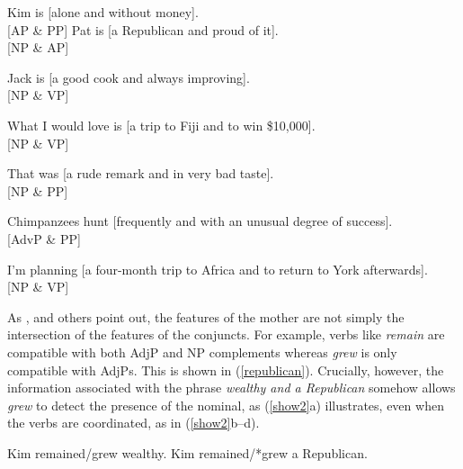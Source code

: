 \documentclass[output=paper
                ,modfonts
                ,nonflat
	        ,collection
	        ,collectionchapter
	        ,collectiontoclongg
 	        ,biblatex
                ,babelshorthands
                ,newtxmath
                ,draftmode
                ,colorlinks, citecolor=brown
]{./langsci/langscibook}
\begin{document}
{
\begin{exe}
\ex \begin{xlista}
\ex Kim is  [alone and without money].\\
 \hfill [AP \& PP]
\ex  Pat is [a Republican and proud of it]. \\
 \hfill [NP \& AP]

\ex  Jack is [a good cook and always improving].\\ \hfill [NP \& VP]

\ex What I would love is [a trip to Fiji and to win \$10,000].\\
\hfill [NP \& VP]

\ex  That was [a rude remark and in very bad taste]. \\
\hfill [NP \& PP]

\ex Chimpanzees hunt [frequently and with an unusual degree of success].\\
\hfill [AdvP \& PP]

\ex I'm  planning [a four-month trip to Africa and  to return to York afterwards].\\
\hfill [NP \& VP]
 \end{xlista}\label{unlk1}
\end{exe}


\noindent
As  \citet[417]{jacobson}, \citet{Sag:03} and others point out, the features of the mother are not simply the intersection of the features of the conjuncts. 
For example, verbs like \emph{remain} are compatible with both
AdjP and NP complements whereas \emph{grew}
is only compatible with AdjPs.
This is shown in  (\ref{republican}).
Crucially, however, the information associated with
the phrase \emph{wealthy and a Republican}
somehow allows \emph{grew} to detect the presence of
the nominal, as (\ref{show2}a) illustrates, even
when the verbs
are coordinated, as in (\ref{show2}b--d).


\begin{exe}
\ex
\begin{xlista}
\ex  Kim remained/grew wealthy.
\ex  Kim remained/*grew a Republican.
\end{xlista}\label{republican}
\end{exe}



}
\end{document}

